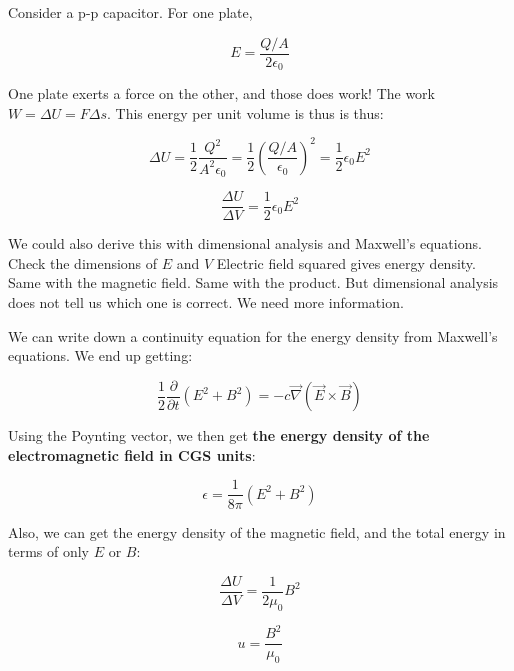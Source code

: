 \documentclass{article}
\begin{document}
Consider a p-p capacitor. For one plate, 

\begin{equation}
    E = \frac{Q/A}{2\epsilon_0}
\end{equation}

One plate exerts a force on the other, and those does work! The work $W = \Delta U = F\Delta s$. This energy per unit volume is thus is thus:

\begin{equation}
    \Delta U = \frac{1}{2}\frac{Q^2}{A^2 \epsilon_0} = \frac12 \left(\frac{Q/A}{\epsilon_0}\right)^2 = \frac{1}{2} \epsilon_0 E^2
\end{equation}

\begin{equation}
    \boxed{\frac{\Delta U}{\Delta V} = \frac{1}{2} \epsilon_0 E^2}
\end{equation}

We could also derive this with dimensional analysis and Maxwell's equations. Check the dimensions of $E$ and $V$ Electric field squared gives energy density. Same with the magnetic field. Same with the product. But dimensional analysis does not tell us which one is correct. We need more information. 

We can write down a continuity equation for the energy density from Maxwell's equations. We end up getting:

\begin{equation}
    \frac12 \frac{\partial}{\partial t}(E^2 + B^2) = -c \vec{\nabla}(\vec{E}\times\vec{B})
\end{equation}

Using the Poynting vector, we then get \textbf{the energy density of the electromagnetic field in CGS units}:

\begin{equation}
    \boxed{\epsilon = \frac{1}{8\pi}\left(E^2 + B^2\right)}
\end{equation}

Also, we can get the energy density of the magnetic field, and the total energy in terms of only $E$ or $B$:

\begin{equation}
    \boxed{\frac{\Delta U}{\Delta V} = \frac{1}{2\mu_0 }B^2}
\end{equation}

\begin{equation}
    \boxed{u = \frac{B^2}{\mu_0}}
\end{equation}
\end{document}
